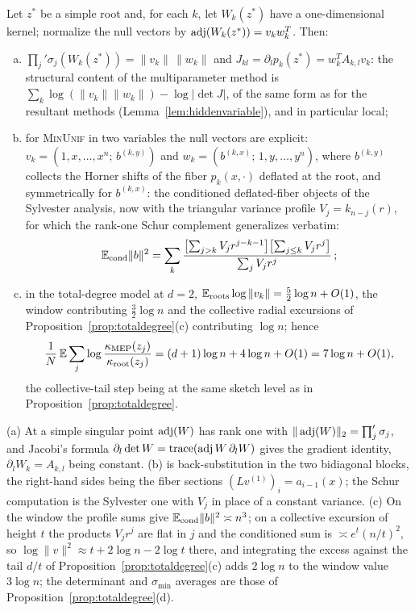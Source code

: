 \begin{proposition}\label{prop:mep}
  Let $z^*$ be a simple root and, for each $k$, let $W_k(z^*)$ have a one-dimensional
  kernel; normalize the null vectors by $\operatorname{adj}(W_k(z^*)) = v_kw_k^T$. Then:
  \begin{enumerate}[(a)]
    \item $\prod_j'\sigma_j(W_k(z^*)) = \|v_k\|\,\|w_k\|$ and
      $J_{kl} = \partial_lp_k(z^*) = w_k^TA_{k,l}v_k$: the structural content of the
      multiparameter method is $\sum_k\log(\|v_k\|\|w_k\|) - \log|\det J|$, of the same
      form as for the resultant methods (Lemma~\ref{lem:hiddenvariable}), and in
      particular local;
    \item for \textsc{MinUnif} in two variables the null vectors are explicit:
      $v_k = (1,x,\dots,x^n;\,b^{(k,y)})$ and $w_k = (b^{(k,x)};\,1,y,\dots,y^n)$, where
      $b^{(k,y)}$ collects the Horner shifts of the fiber $p_k(x,\cdot)$ deflated at the
      root, and symmetrically for $b^{(k,x)}$: the conditioned deflated-fiber objects of
      the Sylvester analysis, now with the triangular variance profile $V_j = k_{n-j}(r)$,
      for which the rank-one Schur complement generalizes verbatim:
      \[
        \mathbb{E}_{\mathrm{cond}}\|b\|^2 = \sum_k\frac{\bigl[\sum_{j>k}V_jr^{j-k-1}\bigr]
        \bigl[\sum_{j\le k}V_jr^j\bigr]}{\sum_jV_jr^j}\,;
      \]
    \item in the total-degree model at $d=2$,
      $\mathbb{E}_{\mathrm{roots}}\log\|v_k\| = \frac52\log n + O(1)$, the window contributing
      $\frac32\log n$ and the collective radial excursions of
      Proposition~\ref{prop:totaldegree}(c) contributing $\log n$; hence
      \[
        \frac1N\,\mathbb{E}\sum_j\log\frac{\kappa_{\mathrm{MEP}}(z_j)}{\kappa_{\mathrm{root}}(z_j)}
        = (d+1)\log n + 4\log n + O(1) = 7\log n + O(1),
      \]
      the collective-tail step being at the same sketch level as in
      Proposition~\ref{prop:totaldegree}.
  \end{enumerate}
\end{proposition}

\proofsketch
(a) At a simple singular point $\operatorname{adj}(W)$ has rank one with
$\|\operatorname{adj}(W)\|_2 = \prod_j'\sigma_j$, and Jacobi's formula
$\partial_l\det W = \operatorname{trace}(\operatorname{adj} W\,\partial_lW)$ gives the gradient identity,
$\partial_lW_k = A_{k,l}$ being constant. (b) is back-substitution in the two bidiagonal
blocks, the right-hand sides being the fiber sections $(Lv^{(1)})_i = a_{i-1}(x)$; the
Schur computation is the Sylvester one with $V_j$ in place of a constant variance. (c) On
the window the profile sums give $\mathbb{E}_{\mathrm{cond}}\|b\|^2\asymp n^3$; on a collective
excursion of height $t$ the products $V_jr^j$ are flat in $j$ and the conditioned sum is
$\asymp e^t(n/t)^2$, so $\log\|v\|^2\approx t + 2\log n - 2\log t$ there, and integrating
the excess against the tail $d/t$ of Proposition~\ref{prop:totaldegree}(c) adds $2\log n$
to the window value $3\log n$; the determinant and $\sigma_{\min}$ averages are those of
Proposition~\ref{prop:totaldegree}(d).
\endproof

